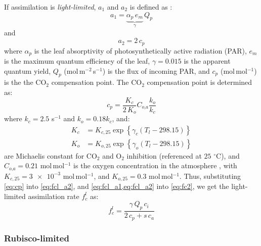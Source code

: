 If assimilation is \textit{light-limited}, $a_1$ and $a_2$ is defined as \citep{Manoli2014,Katul2010}:
\begin{equation}
a_1 = \underbrace{\alpha_p\, e_m}_{\gamma}\, Q_p
\label{eq:fcl_a1}
\end{equation}
and 
\begin{equation}
a_2 = 2\,c_p
\label{eq:fcl_a2}
\end{equation}
where $\alpha_p$ is the leaf absorptivity of photosynthetically active radiation (PAR), $e_m$ is the maximum quantum efficiency of the leaf, $\gamma = 0.015$ is the apparent quantum yield, $Q_p$ (mol\,m$^{-2}$\,s$^{-1}$) is the flux of incoming PAR, and $c_p$ (mol\,mol$^{-1}$) is the the CO$_2$ compensation point. The CO$_2$ compensation point is determined as:
\begin{equation}
c_p = \frac{K_c}{2\,K_o} C_{\textit{o,a}} \frac{k_o}{k_c}
\label{eq:cp}
\end{equation}
where $k_c = 2.5$ s$^{-1}$ and $k_o = 0.18 k_c$, and:
\begin{align}
K_c &= K_{c,25} \exp\left\{ \gamma_c \left(T_l - 298.15\right)\right\} \\
K_o &= K_{o,25} \exp\left\{ \gamma_o \left(T_l - 298.15\right)\right\}
\end{align}
are Michaelis constant for CO$_2$ and O$_2$ inhibition (referenced at $25$ $^{\circ}$C), and $C_{\textit{o,a}} = 0.21$ mol\,mol$^{-1}$ is the oxygen concentration in the atmosphere \citep{Farquhar1980}, with $K_{c,25} = \num{3e-3}$ mol\,mol$^{-1}$, and $K_{o,25} = 0.3$ mol\,mol$^{-1}$. Thus, substituting \cref{eq:cp} into \cref{eq:fcl_a2}, and  \cref{eq:fcl_a1,eq:fcl_a2} into \cref{eq:fc2}, we get the light-limited assimilation rate $f_c^l$ as:
\begin{equation}
f_c^l = \frac{\gamma\,Q_p\,c_i}{2\,c_p + s\,c_a}
\end{equation}

\subsubsection*{Rubisco-limited}

